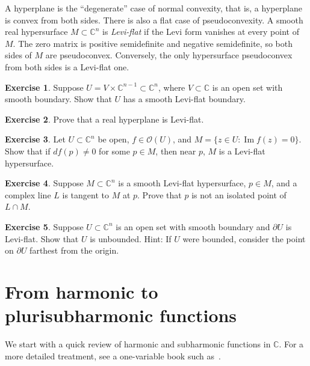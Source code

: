 \documentclass[12pt,openany]{book}
\renewcommand{\Im}{\operatorname{Im}}
\newcommand{\C}{{\mathbb{C}}}
\newcommand{\sO}{{\mathscr{O}}}
\newcommand{\myindex}[1]{#1\index{#1}}
\theoremstyle{plain}
\theoremstyle{remark}
\theoremstyle{definition}
\newenvironment{exbox}{%
    \def\FrameCommand{\vrule width 1pt \relax\hspace{10pt}}%
    \MakeFramed{\advance\hsize-\width\FrameRestore}%
}{%
    \endMakeFramed
}
\theoremstyle{exercise}
\newtheorem{exercise}{Exercise}[section]
\theoremstyle{example}
\begin{document}
A hyperplane is the ``degenerate'' case of normal convexity,
that is, a hyperplane is convex from both sides.
There is also a flat case of pseudoconvexity.  A smooth real hypersurface
$M \subset \C^n$ is \emph{\myindex{Levi-flat}} if the Levi form
vanishes at every point of $M$.  The zero matrix is positive semidefinite
and negative semidefinite, so both sides of $M$ are pseudoconvex.
Conversely, the only hypersurface pseudoconvex from both sides is a
Levi-flat one.

\begin{exbox}
\begin{exercise}
Suppose $U = V \times \C^{n-1} \subset \C^n$, where $V \subset \C$ is an
open set with smooth boundary.  Show that $U$ has a smooth Levi-flat boundary.
\end{exercise}

\begin{exercise}
Prove that a real hyperplane is Levi-flat.
\end{exercise}

\begin{exercise}
Let $U \subset \C^n$ be open, $f \in \sO(U)$, and
$M = \bigl\{ z \in U : \Im f(z) = 0 \bigr\}$.  Show that
if $df(p) \neq 0$ for some $p \in M$, then near $p$,
$M$ is a Levi-flat hypersurface.
\end{exercise}


\begin{exercise}
Suppose $M \subset \C^n$ is a smooth Levi-flat hypersurface,
$p \in M$, and
a complex line $L$ is tangent to $M$ at $p$.
Prove that $p$ is not an isolated point of $L \cap M$.
\end{exercise}

\begin{exercise}
Suppose $U \subset \C^n$ is an open set with smooth boundary
and $\partial U$ is Levi-flat.
Show that $U$ is unbounded.
Hint: If $U$ were bounded, consider the point on $\partial U$ farthest from
the origin.
\end{exercise}
\end{exbox}


\section{From harmonic to plurisubharmonic functions}
\label{sec:harmonic}

We start with a quick review of harmonic and subharmonic functions in $\C$.
For a more detailed treatment, see a one-variable book such as~\cite{Lebl:ca}.
\end{document}

